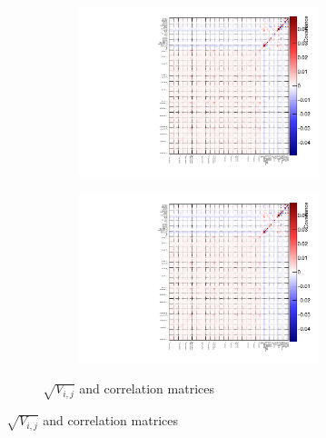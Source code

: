 \begin{figure}[h]
\begin{subfigure}[t]{\textwidth}
	\begin{subfigure}[t]{0.49\textwidth}
		\includegraphics[width=\textwidth, trim={0mm 0mm 0mm 0mm}, clip,page=5]{figures/mach3/data/corr/2017b_NewData_NewDet_UpdXsecStep_2Xsec_4Det_5Flux_0_drawCorr}
	\end{subfigure}
	\begin{subfigure}[t]{0.49\textwidth}
		\includegraphics[width=\textwidth, trim={0mm 0mm 0mm 0mm}, clip,page=6]{figures/mach3/data/corr/2017b_NewData_NewDet_UpdXsecStep_2Xsec_4Det_5Flux_0_drawCorr}
	\end{subfigure}
\caption{$\sqrt{V_{i,j}}$ and correlation matrices}
\end{subfigure}


\end{figure}
